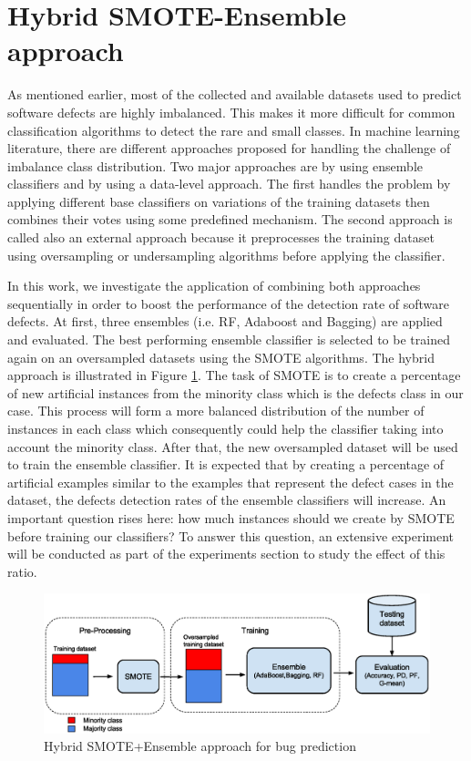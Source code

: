 \documentclass[runningheads,a4paper]{llncs}
\begin{document}
\section{Hybrid SMOTE-Ensemble approach}
\label{SMOTE-Ensemble}

As mentioned earlier, most of the collected and available datasets used to predict software defects are highly imbalanced. This makes it more difficult for common classification algorithms to detect the rare and small classes. In machine learning literature, there are different approaches proposed for handling the challenge of imbalance class distribution. Two major approaches are by using ensemble classifiers and by using a data-level approach. The first handles the problem by applying different base classifiers on variations of the training datasets then combines their votes using some predefined mechanism. The second approach is called also an external approach because it preprocesses the training dataset using oversampling or undersampling algorithms before applying the classifier. 

In this work, we investigate the application of combining both approaches sequentially in order to boost the performance of the detection rate of software defects. At first, three ensembles (i.e. RF, Adaboost and Bagging) are applied and evaluated. The best performing ensemble classifier is selected to be trained again on an oversampled datasets using the SMOTE algorithms. The hybrid approach is illustrated in Figure \ref{fig:fig1}. The task of SMOTE is to create a percentage of new artificial instances from the minority class which is the defects class in our case. This process will form a more balanced distribution of the number of instances in each class which consequently could help the classifier taking into account the minority class. After that, the new oversampled dataset will be used to train the ensemble classifier. It is expected that by creating a percentage of artificial examples similar to the examples that represent the defect cases in the dataset, the defects detection rates of the ensemble classifiers will increase. An important question rises here: how much instances should we create by SMOTE before training our classifiers? To answer this question, an extensive experiment will be conducted as part of the experiments section to study the effect of this ratio.
 

\begin{figure}[H]
\centering
\includegraphics[scale=0.40]{Framework.eps}
\caption{Hybrid SMOTE+Ensemble approach for bug prediction}
\label{fig:fig1}
\end{figure}
\end{document}
